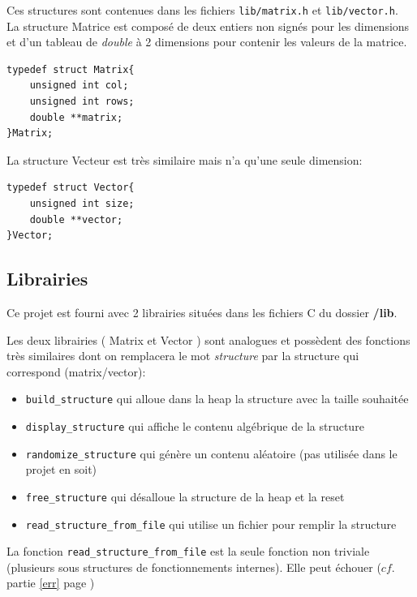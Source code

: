 \documentclass[11pt, a4paper]{article}
\begin{document}
Ces structures sont contenues dans les fichiers \texttt{lib/matrix.h} et \texttt{lib/vector.h}.\\

La structure Matrice est composé de deux entiers non signés pour les dimensions et d'un tableau de \textit{double} à 2 dimensions pour contenir les valeurs de la matrice.\\

\begin{lstlisting}
typedef struct Matrix{
    unsigned int col;
    unsigned int rows;
    double **matrix; 
}Matrix;
\end{lstlisting}

La structure Vecteur est très similaire mais n'a qu'une seule dimension:\\

\begin{lstlisting}
typedef struct Vector{
    unsigned int size;
    double **vector; 
}Vector;
\end{lstlisting}

\subsection{Librairies}

Ce projet est fourni avec 2 librairies situées dans les fichiers C du dossier \textbf{/lib}.

Les deux librairies ( Matrix et Vector ) sont analogues et possèdent des fonctions très similaires dont on remplacera le mot \textit{structure} par la structure qui correspond (matrix/vector):

\begin{itemize}
    \item \texttt{build\_structure} qui alloue dans la heap la structure avec la taille souhaitée
    \item \texttt{display\_structure} qui affiche le contenu algébrique de la structure
    \item \texttt{randomize\_structure} qui génère un contenu aléatoire (pas utilisée dans le projet en soit)
    \item \texttt{free\_structure} qui désalloue la structure de la heap et la reset
    \item \texttt{read\_structure\_from\_file} qui utilise un fichier pour remplir la structure\\
\end{itemize}

La fonction \texttt{read\_structure\_from\_file} est la seule fonction non triviale (plusieurs sous structures de fonctionnements internes). Elle peut échouer ($cf.$ partie \ref{err} page \pageref{err})
\end{document}
